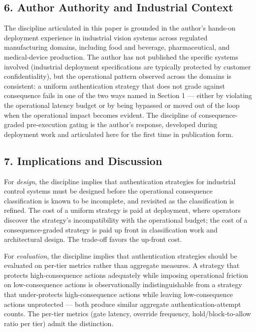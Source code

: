 \subsection{6. Author Authority and Industrial
Context}\label{author-authority-and-industrial-context}

The discipline articulated in this paper is grounded in the author's
hands-on deployment experience in industrial vision systems across
regulated manufacturing domains, including food and beverage,
pharmaceutical, and medical-device production. The author has not
published the specific systems involved (industrial deployment
specifications are typically protected by customer confidentiality), but
the operational pattern observed across the domains is consistent: a
uniform authentication strategy that does not grade against consequence
fails in one of the two ways named in Section 1 --- either by violating
the operational latency budget or by being bypassed or moved out of the
loop when the operational impact becomes evident. The discipline of
consequence-graded pre-execution gating is the author's response,
developed during deployment work and articulated here for the first time
in publication form.

\subsection{7. Implications and
Discussion}\label{implications-and-discussion}

For \emph{design}, the discipline implies that authentication strategies
for industrial control systems must be designed before the operational
consequence classification is known to be incomplete, and revisited as
the classification is refined. The cost of a uniform strategy is paid at
deployment, where operators discover the strategy's incompatibility with
the operational budget; the cost of a consequence-graded strategy is
paid up front in classification work and architectural design. The
trade-off favors the up-front cost.

For \emph{evaluation}, the discipline implies that authentication
strategies should be evaluated on per-tier metrics rather than aggregate
measures. A strategy that protects high-consequence actions adequately
while imposing operational friction on low-consequence actions is
observationally indistinguishable from a strategy that under-protects
high-consequence actions while leaving low-consequence actions
unprotected --- both produce similar aggregate authentication-attempt
counts. The per-tier metrics (gate latency, override frequency,
hold/block-to-allow ratio per tier) admit the distinction.

